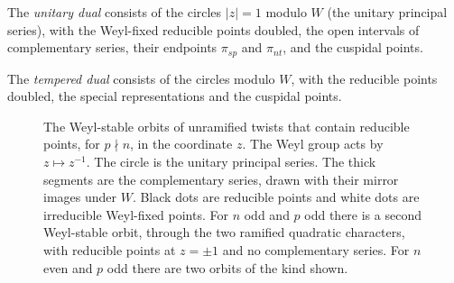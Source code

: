 \documentclass[12pt,letterpaper]{article}
\numberwithin{equation}{section}
\theoremstyle{definition}
\DeclareMathOperator{\re}{Re}
\begin{document}
The \emph{unitary dual} consists of the circles $|z|=1$ modulo $W$ (the unitary principal
series), with the Weyl-fixed reducible points doubled, the open intervals of
complementary series, their endpoints $\pi_{sp}$ and $\pi_{nt}$, and the cuspidal points.

The \emph{tempered dual} consists of the circles modulo $W$, with the reducible points
doubled, the special representations and the cuspidal points.

\begin{figure}[ht]
\centering
{}
\caption{The Weyl-stable orbits of unramified twists that contain reducible points, for
$p\nmid n$, in the coordinate $z$.  The Weyl group acts by $z\mapsto z^{-1}$.  The circle
is the unitary principal series.  The thick segments are the complementary series, drawn
with their mirror images under $W$.  Black dots are reducible points and white dots are
irreducible Weyl-fixed points.  For $n$ odd and $p$ odd there is a second Weyl-stable
orbit, through the two ramified quadratic characters, with reducible points at $z=\pm1$
and no complementary series.  For $n$ even and $p$ odd there are two orbits of the kind
shown.}\label{fig:dual}
\end{figure}
\end{document}
